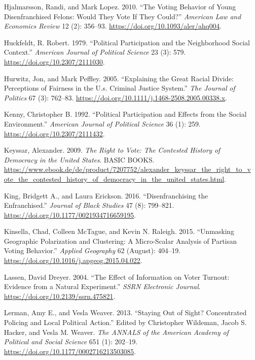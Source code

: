 \documentclass[]{article}
\begin{document}
\leavevmode\hypertarget{ref-Hjalmarsson2010}{}%
Hjalmarsson, Randi, and Mark Lopez. 2010. ``The Voting Behavior of Young Disenfranchised Felons: Would They Vote If They Could?'' \emph{American Law and Economics Review} 12 (2): 356--93. \url{https://doi.org/10.1093/aler/ahq004}.

\leavevmode\hypertarget{ref-Huckfeldt1979}{}%
Huckfeldt, R. Robert. 1979. ``Political Participation and the Neighborhood Social Context.'' \emph{American Journal of Political Science} 23 (3): 579. \url{https://doi.org/10.2307/2111030}.

\leavevmode\hypertarget{ref-Hurwitz2005}{}%
Hurwitz, Jon, and Mark Peffley. 2005. ``Explaining the Great Racial Divide: Perceptions of Fairness in the U.s. Criminal Justice System.'' \emph{The Journal of Politics} 67 (3): 762--83. \url{https://doi.org/10.1111/j.1468-2508.2005.00338.x}.

\leavevmode\hypertarget{ref-Kenny1992}{}%
Kenny, Christopher B. 1992. ``Political Participation and Effects from the Social Environment.'' \emph{American Journal of Political Science} 36 (1): 259. \url{https://doi.org/10.2307/2111432}.

\leavevmode\hypertarget{ref-Keyssar2009}{}%
Keyssar, Alexander. 2009. \emph{The Right to Vote: The Contested History of Democracy in the United States}. BASIC BOOKS. \url{https://www.ebook.de/de/product/7207752/alexander_keyssar_the_right_to_vote_the_contested_history_of_democracy_in_the_united_states.html}.

\leavevmode\hypertarget{ref-King2016}{}%
King, Bridgett A., and Laura Erickson. 2016. ``Disenfranchising the Enfranchised.'' \emph{Journal of Black Studies} 47 (8): 799--821. \url{https://doi.org/10.1177/0021934716659195}.

\leavevmode\hypertarget{ref-Kinsella2015}{}%
Kinsella, Chad, Colleen McTague, and Kevin N. Raleigh. 2015. ``Unmasking Geographic Polarization and Clustering: A Micro-Scalar Analysis of Partisan Voting Behavior.'' \emph{Applied Geography} 62 (August): 404--19. \url{https://doi.org/10.1016/j.apgeog.2015.04.022}.

\leavevmode\hypertarget{ref-Lassen2004}{}%
Lassen, David Dreyer. 2004. ``The Effect of Information on Voter Turnout: Evidence from a Natural Experiment.'' \emph{SSRN Electronic Journal}. \url{https://doi.org/10.2139/ssrn.475821}.

\leavevmode\hypertarget{ref-Lerman2013}{}%
Lerman, Amy E., and Vesla Weaver. 2013. ``Staying Out of Sight? Concentrated Policing and Local Political Action.'' Edited by Christopher Wildeman, Jacob S. Hacker, and Vesla M. Weaver. \emph{The ANNALS of the American Academy of Political and Social Science} 651 (1): 202--19. \url{https://doi.org/10.1177/0002716213503085}.
\end{document}
